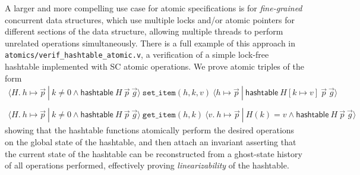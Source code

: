\documentclass[11pt]{article}
\begin{document}
A larger and more compelling use case for atomic specifications is for \emph{fine-grained} concurrent data structures, which use multiple locks and/or atomic pointers for different sections of the data structure, allowing multiple threads to perform unrelated operations simultaneously. There is a full example of this approach in \texttt{atomics/verif\_hashtable\_atomic.v}, a verification of a simple lock-free hashtable implemented with SC atomic operations. We prove atomic triples of the form
\[\begin{array}{c}
\langle H.\ h \mapsto \vec{p}\ |\ k \neq 0 \land \mathsf{hashtable}\ H\ \vec{p}\ \vec{g}\rangle\ \texttt{set\_item}(h, k, v) \ \langle h \mapsto \vec{p}\ |\ \mathsf{hashtable}\ H[k \mapsto v]\ \vec{p}\ \vec{g}\rangle
\\
\\
\langle H.\ h \mapsto \vec{p}\ |\ k \neq 0 \land \mathsf{hashtable}\ H\ \vec{p}\ \vec{g}\rangle\ \texttt{get\_item}(h, k)\  \langle v.\ h \mapsto \vec{p}\ |\ H(k) = v \land \mathsf{hashtable}\ H\ \vec{p}\ \vec{g}\rangle
\end{array}\]
showing that the hashtable functions atomically perform the desired operations on the global state of the hashtable, and then attach an invariant asserting that the current state of the hashtable can be reconstructed from a ghost-state history of all operations performed, effectively proving \emph{linearizability} of the hashtable.

\end{document}
